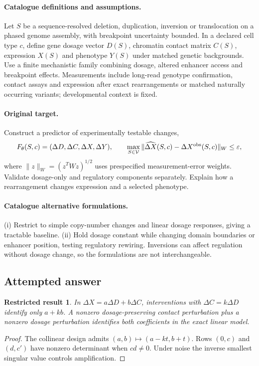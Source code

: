 \documentclass[11pt]{article}
\newtheorem{attemptresult}{Restricted result}[section]
\begin{document}
\paragraph{Catalogue definitions and assumptions.}
Let $S$ be a sequence-resolved deletion, duplication, inversion or translocation on a phased genome assembly, with breakpoint uncertainty bounded. In a declared cell type $c$, define gene dosage vector $D(S)$, chromatin contact matrix $C(S)$, expression $X(S)$ and phenotype $Y(S)$ under matched genetic backgrounds. Use a finite mechanistic family combining dosage, altered enhancer access and breakpoint effects. Measurements include long-read genotype confirmation, contact assays and expression after exact rearrangements or matched naturally occurring variants; developmental context is fixed.
\paragraph{Original target.}
Construct a predictor of experimentally testable changes,
\[
F_\theta(S,c)=(\Delta D,\Delta C,\Delta X,\Delta Y),\qquad
\max_{S\in\mathcal V}\|\widehat{\Delta X}(S,c)-\Delta X^{\rm obs}(S,c)\|_W\leq\varepsilon,
\]
where $\|z\|_W=(z^TWz)^{1/2}$ uses prespecified measurement-error weights. Validate dosage-only and regulatory components separately. Explain how a rearrangement changes expression and a selected phenotype.
\paragraph{Catalogue alternative formulations.}
(i) Restrict to simple copy-number changes and linear dosage responses, giving a tractable baseline. (ii) Hold dosage constant while changing domain boundaries or enhancer position, testing regulatory rewiring. Inversions can affect regulation without dosage change, so the formulations are not interchangeable.
\subsection{Attempted answer}
\begin{attemptresult}
In $\Delta X=a\Delta D+b\Delta C$, interventions with $\Delta C=k\Delta D$ identify only $a+kb$. A nonzero dosage-preserving contact perturbation plus a nonzero dosage perturbation identifies both coefficients in the exact linear model.
\end{attemptresult}
\begin{proof}
The collinear design admits $(a,b)\mapsto(a-kt,b+t)$. Rows $(0,c)$ and $(d,c\prime)$ have nonzero determinant when $cd\ne0$. Under noise the inverse smallest singular value controls amplification.
\end{proof}
\end{document}
